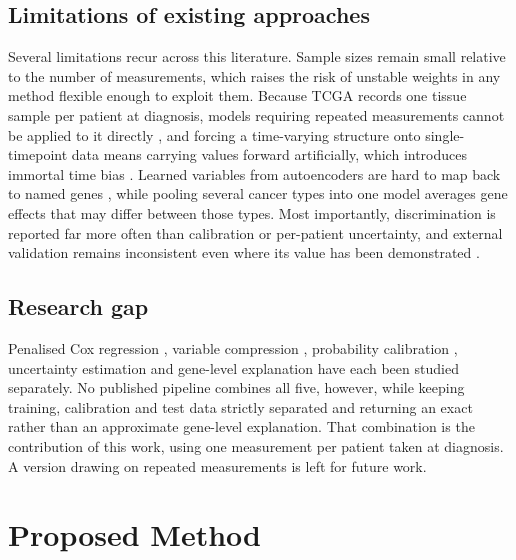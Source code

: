 \documentclass[10pt,a4paper]{article}
\begin{document}
\subsection{Limitations of existing approaches}

Several limitations recur across this literature. Sample sizes remain small
relative to the number of measurements, which raises the risk of unstable weights
in any method flexible enough to exploit them. Because TCGA records one tissue
sample per patient at diagnosis, models requiring repeated measurements cannot be
applied to it directly \citep{lee2020dynamic}, and forcing a time-varying structure
onto single-timepoint data means carrying values forward artificially, which
introduces immortal time bias \citep{suissa2008immortal}. Learned variables from
autoencoders are hard to map back to named genes \citep{chaudhary2018deep}, while
pooling several cancer types into one model averages gene effects that may differ
between those types. Most importantly, discrimination is reported far more often
than calibration or per-patient uncertainty, and external validation remains
inconsistent even where its value has been demonstrated
\citep{poirion2021deepprog}.

\subsection{Research gap}

Penalised Cox regression \citep{tibshirani1997lasso, simon2011regularization},
variable compression \citep{vanhouwelingen2006crossvalidated}, probability
calibration \citep{niculescu2005predicting}, uncertainty estimation
\citep{lee2020dynamic} and gene-level explanation \citep{hao2019coxpasnet} have
each been studied separately. No published pipeline combines all five, however,
while keeping training, calibration and test data strictly separated and returning
an exact rather than an approximate gene-level explanation. That combination is the
contribution of this work, using one measurement per patient taken at diagnosis. A
version drawing on repeated measurements is left for future work.

\section{Proposed Method}
\end{document}
